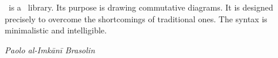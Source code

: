 




\thispagestyle{empty}
\noindent
{}\\[0.62em]
\\[1.62em]
\par
\vfill
{}


\newpage
\noindent\koDi\ is a \TikZ\ library. Its purpose
is drawing commutative diagrams.
It is designed precisely to overcome
the shortcomings of traditional ones.
The syntax is minimalistic and intelligible.\par
\hfill{\itshape Paolo al-Imkānī Brasolin}

% 
% 
% 
% 
% 
% 
\newpage

